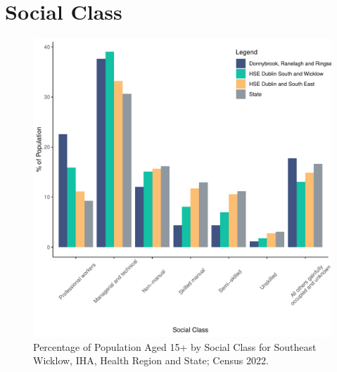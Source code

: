 \documentclass{article}
\begin{document}
\section{Social Class}\label{sect:SC}
\begin{figure}[H]
	\centering
	\includegraphics[width = 140mm]{../figures/SocialClassED.pdf}
	\caption{Percentage of Population Aged 15+ by Social Class for Southeast Wicklow, IHA, Health Region and State; Census 2022.}
	\label{fig:vbnv}
	\end{figure}
\end{document}
